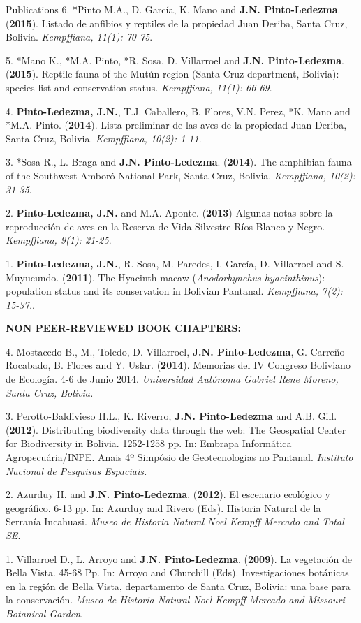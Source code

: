 \documentclass{resume} %
\begin{document}
\begin{rSection}{Publications}
{6.} {*Pinto M.A., D. García, K. Mano and} {\bf{J.N. Pinto-Ledezma}}. {({{\bf 2015}}). Listado de anfibios y reptiles de la propiedad Juan Deriba, Santa Cruz, Bolivia.} {\em Kempffiana, 11(1): 70-75}.

{5.} {*Mano K., *M.A. Pinto, *R. Sosa, D. Villarroel and} {\bf{J.N. Pinto-Ledezma}}. {({{\bf 2015}}). Reptile fauna of the Mutún region (Santa Cruz department, Bolivia): species list and conservation status.} {\em Kempffiana, 11(1): 66-69}.

{4.} {\bf{Pinto-Ledezma, J.N.}}, {T.J. Caballero, B. Flores, V.N. Perez, *K. Mano and *M.A. Pinto. ({{\bf 2014}}). Lista preliminar de las aves de la propiedad Juan Deriba, Santa Cruz, Bolivia.} {\em Kempffiana, 10(2): 1-11}.

{3.} {*Sosa R., L. Braga and} {\bf{J.N. Pinto-Ledezma}}. {({{\bf 2014}}). The amphibian fauna of the Southwest Amboró National Park, Santa Cruz, Bolivia.} {\em Kempffiana, 10(2): 31-35}.

{2.} {\bf{Pinto-Ledezma, J.N.}} {and M.A. Aponte. ({{\bf 2013}}) Algunas notas sobre la reproducción de aves en la Reserva de Vida Silvestre Ríos Blanco y Negro.} {\em Kempffiana, 9(1): 21-25}.

{1.} {\bf{Pinto-Ledezma, J.N.}}, {R. Sosa, M. Paredes, I. García, D. Villarroel and S. Muyucundo. ({{\bf 2011}}). The Hyacinth macaw ({\em Anodorhynchus hyacinthinus}): population status and its conservation in Bolivian Pantanal.} {\em Kempffiana, 7(2): 15-37.}. 

{\bf NON PEER-REVIEWED BOOK CHAPTERS:}

{4.} {Mostacedo B., M., Toledo, D. Villarroel,} {\bf{J.N. Pinto-Ledezma}}, G. Carreño-Rocabado, B. Flores and Y. Uslar. ({{\bf 2014}}). Memorias del IV Congreso Boliviano de Ecología. 4-6 de Junio 2014. {\em Universidad Autónoma Gabriel Rene Moreno, Santa Cruz, Bolivia.}

{3.} {Perotto-Baldivieso H.L., K. Riverro, } {\bf{J.N. Pinto-Ledezma}} {and A.B. Gill. ({{\bf 2012}}). Distributing biodiversity data through the web: The Geospatial Center for Biodiversity in Bolivia. 1252-1258 pp. In: Embrapa Informática Agropecuária/INPE. Anais 4º Simpósio de Geotecnologias no Pantanal.} {\em Instituto Nacional de Pesquisas Espaciais.} 

{2.} {Azurduy H. and} {\bf{J.N. Pinto-Ledezma}}. {({{\bf 2012}}). El escenario ecológico y geográfico. 6-13 pp. In: Azurduy and Rivero (Eds). Historia Natural de la Serranía Incahuasi.} {\em Museo de Historia Natural Noel Kempff Mercado and Total SE}.

{1.} {Villarroel D., L. Arroyo and} {\bf{J.N. Pinto-Ledezma}}. {({{\bf 2009}}). La vegetación de Bella Vista. 45-68 Pp. In: Arroyo and Churchill (Eds). Investigaciones botánicas en la región de Bella Vista, departamento de Santa Cruz, Bolivia: una base para la conservación.} {\em Museo de Historia Natural Noel Kempff Mercado and Missouri Botanical Garden}. 

\end{rSection}
\end{document}
